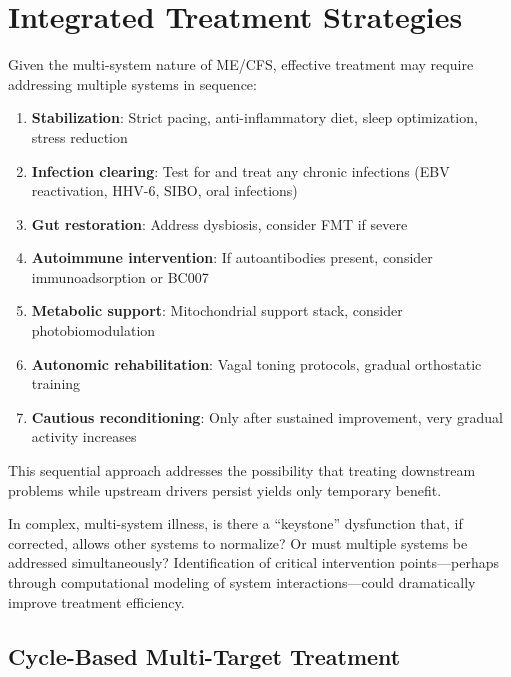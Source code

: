 \section{Integrated Treatment Strategies}
\label{sec:integrated-strategies}

\begin{hypothesis}
Given the multi-system nature of ME/CFS, effective treatment may require addressing multiple systems in sequence:
\begin{enumerate}
    \item \textbf{Stabilization}: Strict pacing, anti-inflammatory diet, sleep optimization, stress reduction
    \item \textbf{Infection clearing}: Test for and treat any chronic infections (EBV reactivation, HHV-6, SIBO, oral infections)
    \item \textbf{Gut restoration}: Address dysbiosis, consider FMT if severe
    \item \textbf{Autoimmune intervention}: If autoantibodies present, consider immunoadsorption or BC007
    \item \textbf{Metabolic support}: Mitochondrial support stack, consider photobiomodulation
    \item \textbf{Autonomic rehabilitation}: Vagal toning protocols, gradual orthostatic training
    \item \textbf{Cautious reconditioning}: Only after sustained improvement, very gradual activity increases
\end{enumerate}
This sequential approach addresses the possibility that treating downstream problems while upstream drivers persist yields only temporary benefit.
\end{hypothesis}

\begin{open_question}
In complex, multi-system illness, is there a ``keystone'' dysfunction that, if corrected, allows other systems to normalize? Or must multiple systems be addressed simultaneously? Identification of critical intervention points---perhaps through computational modeling of system interactions---could dramatically improve treatment efficiency.
\end{open_question}

\subsection{Cycle-Based Multi-Target Treatment}
\label{subsec:cycle-based-treatment}

